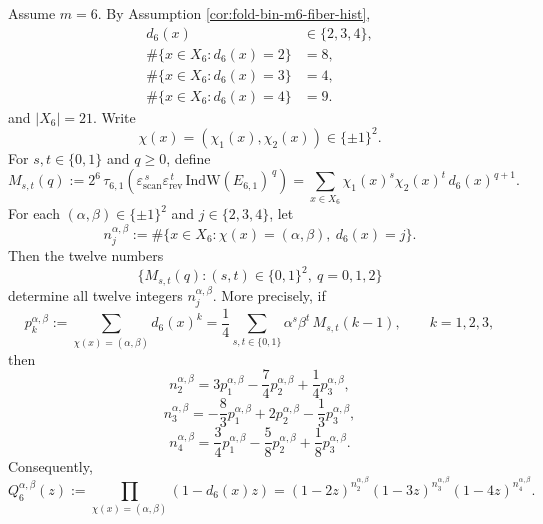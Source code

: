 \begin{theorem}\label{thm:fold-window6-chi-layered-spectrum-reconstruction-by-12-moments}
Assume \(m=6\). By Assumption \ref{cor:fold-bin-m6-fiber-hist},
\[
\begin{aligned}
d_6(x)&\in\{2,3,4\},\\
\#\{x\in X_6:d_6(x)=2\}&=8,\\
\#\{x\in X_6:d_6(x)=3\}&=4,\\
\#\{x\in X_6:d_6(x)=4\}&=9.
\end{aligned}
\]
and \(|X_6|=21\).
Write
\[
\chi(x)=(\chi_1(x),\chi_2(x))\in\{\pm1\}^2.
\]
For \(s,t\in\{0,1\}\) and \(q\ge 0\), define
\[
M_{s,t}(q)
:=
2^6\,\tau_{6,1}\!\left(
\varepsilon_{\mathrm{scan}}^{\,s}\varepsilon_{\mathrm{rev}}^{\,t}\,
\mathrm{IndW}(E_{6,1})^{\,q}
\right)
=
\sum_{x\in X_6}\chi_1(x)^s\chi_2(x)^t\,d_6(x)^{q+1}.
\]
For each \((\alpha,\beta)\in\{\pm1\}^2\) and \(j\in\{2,3,4\}\), let
\[
n_j^{\alpha,\beta}
:=
\#\{x\in X_6:\chi(x)=(\alpha,\beta),\ d_6(x)=j\}.
\]
Then the twelve numbers
\[
\{M_{s,t}(q):(s,t)\in\{0,1\}^2,\ q=0,1,2\}
\]
determine all twelve integers \(n_j^{\alpha,\beta}\). More precisely, if
\[
p_k^{\alpha,\beta}
:=
\sum_{\chi(x)=(\alpha,\beta)}d_6(x)^k
=
\frac14\sum_{s,t\in\{0,1\}}\alpha^s\beta^t\,M_{s,t}(k-1),
\qquad k=1,2,3,
\]
then
\[
n_2^{\alpha,\beta}
=
3p_1^{\alpha,\beta}-\frac74p_2^{\alpha,\beta}+\frac14p_3^{\alpha,\beta},
\]
\[
n_3^{\alpha,\beta}
=
-\frac83p_1^{\alpha,\beta}+2p_2^{\alpha,\beta}-\frac13p_3^{\alpha,\beta},
\]
\[
n_4^{\alpha,\beta}
=
\frac34p_1^{\alpha,\beta}-\frac58p_2^{\alpha,\beta}+\frac18p_3^{\alpha,\beta}.
\]
Consequently,
\[
Q_6^{\alpha,\beta}(z)
:=
\prod_{\chi(x)=(\alpha,\beta)}(1-d_6(x)z)
=
(1-2z)^{n_2^{\alpha,\beta}}(1-3z)^{n_3^{\alpha,\beta}}(1-4z)^{n_4^{\alpha,\beta}}.
\]
\end{theorem}

